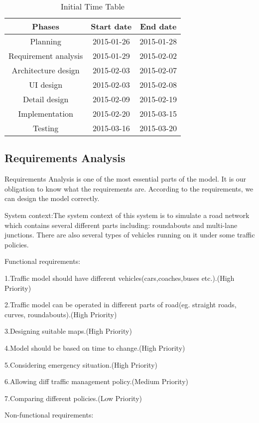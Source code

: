\documentclass[12pt]{amsart}
\begin{document}
\begin{table}[h]
\begin{tabular}{ | c | c | c | }
\hline
Phases & Start date & End date\\
\hline
Planning & 2015-01-26 & 2015-01-28\\
\hline
Requirement analysis & 2015-01-29 & 2015-02-02\\
\hline
Architecture design & 2015-02-03 & 2015-02-07\\
\hline
UI design & 2015-02-03 & 2015-02-08\\
\hline
Detail design & 2015-02-09 & 2015-02-19\\
\hline
Implementation & 2015-02-20 & 2015-03-15\\
\hline
Testing & 2015-03-16 & 2015-03-20\\
\hline
\end{tabular}
\caption{Initial Time Table}
\end{table}

\subsection{Requirements Analysis}
Requirements Analysis is one of the most essential parts of the model. It is our obligation to know what the requirements are. According to the requirements, we can design the model correctly.

System context:The system context of this system is to simulate a road network which contains several different parts including: roundabouts and multi-lane junctions. There are also several types of vehicles running on it under some traffic policies.

Functional requirements:

1.Traffic model should have different vehicles(cars,coaches,buses etc.).(High Priority)

2.Traffic model can be operated in different parts of road(eg. straight roads, curves, roundabouts).(High Priority)

3.Designing suitable maps.(High Priority)

4.Model should be based on time to change.(High Priority)

5.Considering emergency situation.(High Priority)

6.Allowing diff traffic management policy.(Medium Priority)

7.Comparing different policies.(Low Priority)

Non-functional requirements:
\end{document}
